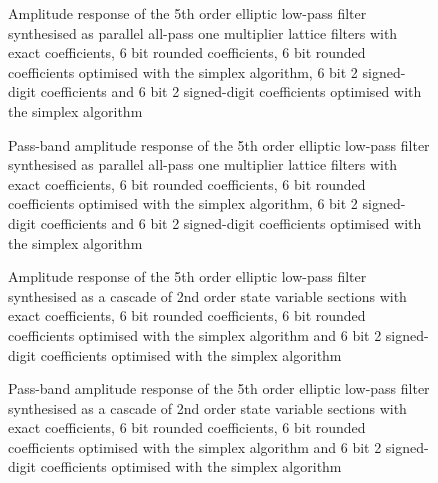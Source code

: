 \documentclass[a4paper,twoside,10pt,english]{report}
\begin{document}
\begin{figure}[!htbp]
\begin{center}
\scalebox{0.7}{}
\caption{Amplitude response of the 5th order elliptic low-pass filter 
synthesised as parallel all-pass one multiplier lattice filters with exact
coefficients, 6 bit rounded coefficients, 6 bit rounded coefficients
optimised with the simplex algorithm, 6 bit 2 signed-digit coefficients and
6 bit 2 signed-digit coefficients optimised with the simplex algorithm}
\label{fig:simplex_OneMPA_lattice_response}
\end{center}
\end{figure}
\begin{figure}[!htbp]
\begin{center}
\scalebox{0.7}{}
\caption{Pass-band amplitude response of the 5th order elliptic low-pass filter
synthesised as parallel all-pass one multiplier lattice filters with exact
coefficients, 6 bit rounded coefficients, 6 bit rounded coefficients
optimised with the simplex algorithm, 6 bit 2 signed-digit coefficients and
6 bit 2 signed-digit coefficients optimised with the simplex algorithm}
\label{fig:simplex_OneMPA_lattice_passband_response}
\end{center}
\end{figure}
\begin{figure}[!htbp]
\begin{center}
\scalebox{0.7}{}
\caption{Amplitude response of the 5th order elliptic low-pass
filter synthesised as a cascade of 2nd order state variable sections with 
exact coefficients, 6 bit rounded coefficients, 6 bit rounded coefficients 
optimised with the simplex algorithm
and 6 bit 2 signed-digit coefficients optimised with the simplex algorithm}
\label{fig:simplex_svcasc_response}
\end{center}
\end{figure}
\begin{figure}[!htbp]
\begin{center}
\scalebox{0.7}{}
\caption{Pass-band amplitude response of the 5th order elliptic low-pass
filter synthesised as a cascade of 2nd order state variable sections with
exact coefficients, 6 bit rounded coefficients, 6 bit rounded coefficients 
optimised with the simplex algorithm
and 6 bit 2 signed-digit coefficients optimised with the simplex algorithm}
\label{fig:simplex_svcasc_passband_response}
\end{center}
\end{figure}
\clearpage
\end{document}
